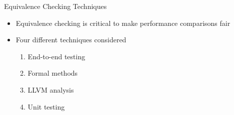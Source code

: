\documentclass[10pt,aspectratio=169]{beamer}
\begin{document}
\begin{frame}{Equivalence Checking Techniques}
    \begin{itemize}
        \item Equivalence checking is critical to make performance comparisons fair
        \vspace*{0.5cm}
        \item Four different techniques considered
        \begin{enumerate}
            \item \alert<2>{End-to-end testing}
            \item Formal methods
            \item LLVM analysis
            \item \alert<2>{Unit testing}
        \end{enumerate}
    \end{itemize}
\end{frame}
\end{document}
